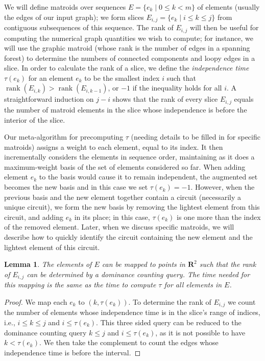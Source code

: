 \documentclass[11pt]{article}
\newcommand{\Real}{\mathbf{R}}
\DeclareMathOperator{\rank}{rank}
\newtheorem{lemma}{Lemma}
\begin{document}
We will define matroids over sequences $E=\{e_k \mid 0 \leq k < m\}$ of elements (usually the edges of our input graph); we form slices $E_{i,j} = \{e_k\mid i\le k\le j\}$ from contiguous subsequences of this sequence. The rank of $E_{i,j}$ will then be useful for computing the numerical graph quantities we wish to compute; for instance, we will use the graphic matroid (whose rank is the number of edges in a spanning forest) to determine the numbers of connected components and loopy edges in a slice. In order to calculate the rank of a slice, we define the \emph{independence time} $\tau(e_k)$ for an element $e_k$ to be the smallest index $i$ such that $\rank(E_{i,k})>\rank(E_{i,k-1})$, or $-1$ if the inequality holds for all $i$. A straightforward induction on $j-i$ shows that the rank of every slice $E_{i,j}$ equals the number of matroid elements in the slice whose independence is before the interior of the slice.

Our meta-algorithm for precomputing $\tau$ (needing details to be filled in for  specific matroids) assigns a weight to each element, equal to its index. It then incrementally considers the elements in sequence order, maintaining as it does a maximum-weight basis of the set of elements considered so far. When adding element $e_k$ to the basis would cause it to remain independent, the augmented set becomes the new basis and in this case we set $\tau(e_k)=-1$. However, when the previous basis and the new element together contain a circuit (necessarily a unique circuit), we form the new basis by removing the lightest element from this circuit, and adding $e_k$ in its place; in this case, $\tau(e_k)$ is one more than the index of the removed element. Later, when we discuss specific matroids, we will describe how to quickly identify the circuit containing the new element and the lightest element of this circuit.

\begin{lemma}\label{lem:general-matroid}
The elements of $E$ can be mapped to points in $\Real^2$ such that the rank of $E_{i,j}$ can be determined by a dominance counting query. The time needed for this mapping is the same as the time to compute $\tau$ for all elements in $E$.
\end{lemma}
\begin{proof}
We map each $e_k$ to $(k, \tau(e_k))$. To determine the rank of $E_{i,j}$ we count the number of elements whose independence time is in the slice's range of indices, i.e.,  $i \leq k \leq j$ and $i \leq \tau(e_k)$. This three sided query can be reduced to the dominance counting query $k \leq j$ and $i \leq \tau(e_k)$, as it is not possible to have $k < \tau(e_k)$. We then take the complement to count the edges whose independence time is before the interval.
\end{proof}
\end{document}
